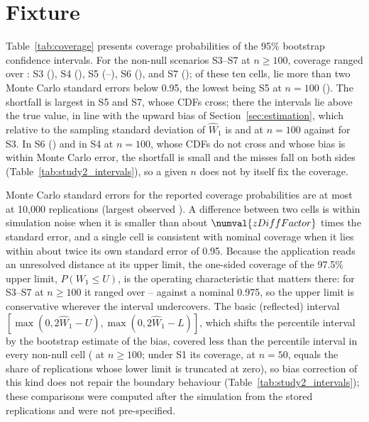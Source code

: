 
\section{Fixture}

Table~\ref{tab:coverage} presents coverage probabilities of the 95\% bootstrap confidence intervals. For the non-null scenarios S3--S7 at $n \geq 100$, coverage ranged over : S3 (), S4 (), S5 (--), S6 (), and S7 (); of these ten cells,  lie more than two Monte Carlo standard errors below 0.95, the lowest being S5 at $n = 100$ (). The shortfall is largest in S5 and S7, whose CDFs cross; there the intervals lie above the true value, in line with the upward bias of Section~\ref{sec:estimation}, which relative to the sampling standard deviation of $\widehat{W}_1$ is  and  at $n = 100$ against  for S3. In S6 () and in S4 at $n = 100$, whose CDFs do not cross and whose bias is within Monte Carlo error, the shortfall is small and the misses fall on both sides (Table~\ref{tab:study2_intervals}), so a given $n$ does not by itself fix the coverage.

Monte Carlo standard errors for the reported coverage probabilities are at most  at 10{,}000 replications (largest observed ). A difference between two cells is within simulation noise when it is smaller than about $\numval{zDiffFactor}$ times the standard error, and a single cell is consistent with nominal coverage when it lies within about twice its own standard error of 0.95. Because the application reads an unresolved distance at its upper limit, the one-sided coverage of the 97.5\% upper limit, $P(W_1 \leq U)$, is the operating characteristic that matters there: for S3--S7 at $n \geq 100$ it ranged over -- against a nominal 0.975, so the upper limit is conservative wherever the interval undercovers. The basic (reflected) interval $[\max(0, 2\widehat{W}_1 - U), \max(0, 2\widehat{W}_1 - L)]$, which shifts the percentile interval by the bootstrap estimate of the bias, covered less than the percentile interval in every non-null cell ( at $n \geq 100$; under S1 its coverage,  at $n = 50$, equals the share of replications whose lower limit is truncated at zero), so bias correction of this kind does not repair the boundary behaviour (Table~\ref{tab:study2_intervals}); these comparisons were computed after the simulation from the stored replications and were not pre-specified.

